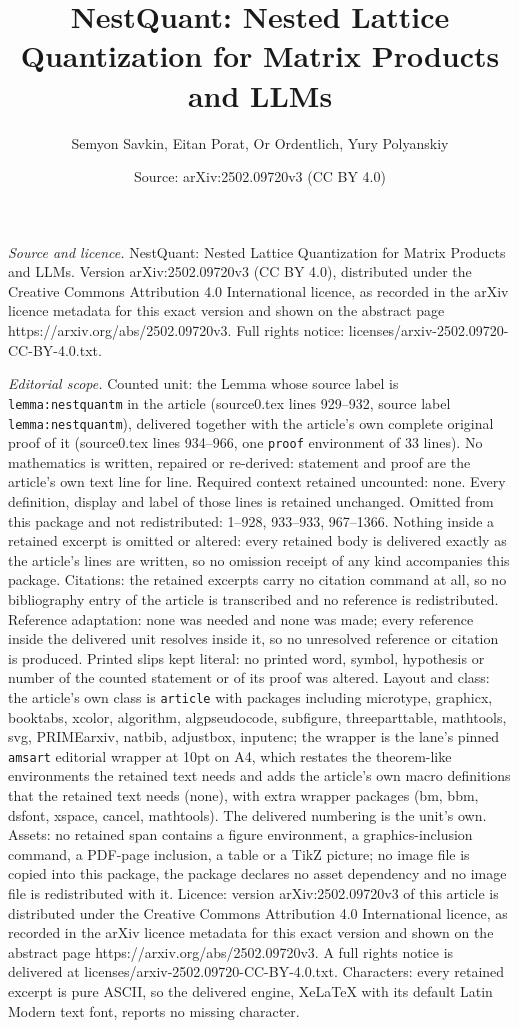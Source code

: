 \documentclass[10pt,a4paper]{amsart}
\title[NestQuant: Nested Lattice Quantization for Matrix Products a]{NestQuant: Nested Lattice Quantization for Matrix Products and LLMs}
\author{Semyon Savkin, Eitan Porat, Or Ordentlich, Yury Polyanskiy}
\date{Source: arXiv:2502.09720v3 (CC BY 4.0)}
\begin{document}
\maketitle

\noindent\emph{Source and licence.} NestQuant: Nested Lattice Quantization for Matrix Products and LLMs. Version arXiv:2502.09720v3 (CC BY 4.0), distributed under the Creative Commons Attribution 4.0 International licence, as recorded in the arXiv licence metadata for this exact version and shown on the abstract page https://arxiv.org/abs/2502.09720v3. Full rights notice: licenses/arxiv-2502.09720-CC-BY-4.0.txt.\par\smallskip

\noindent\textit{Editorial scope.} Counted unit: the Lemma whose source label is \texttt{lemma:nestquantm} in the article (source0.tex lines 929--932, source label \texttt{lemma:nestquantm}), delivered together with the article's own complete original proof of it (source0.tex lines 934--966, one \texttt{proof} environment of 33 lines). No mathematics is written, repaired or re-derived: statement and proof are the article's own text line for line. Required context retained uncounted: none. Every definition, display and label of those lines is retained unchanged. Omitted from this package and not redistributed: 1--928, 933--933, 967--1366. Nothing inside a retained excerpt is omitted or altered: every retained body is delivered exactly as the article's lines are written, so no omission receipt of any kind accompanies this package. Citations: the retained excerpts carry no citation command at all, so no bibliography entry of the article is transcribed and no reference is redistributed. Reference adaptation: none was needed and none was made; every reference inside the delivered unit resolves inside it, so no unresolved reference or citation is produced. Printed slips kept literal: no printed word, symbol, hypothesis or number of the counted statement or of its proof was altered. Layout and class: the article's own class is \texttt{article} with packages including microtype, graphicx, booktabs, xcolor, algorithm, algpseudocode, subfigure, threeparttable, mathtools, svg, PRIMEarxiv, natbib, adjustbox, inputenc; the wrapper is the lane's pinned \texttt{amsart} editorial wrapper at 10pt on A4, which restates the theorem-like environments the retained text needs and adds the article's own macro definitions that the retained text needs (none), with extra wrapper packages (bm, bbm, dsfont, xspace, cancel, mathtools). The delivered numbering is the unit's own. Assets: no retained span contains a figure environment, a graphics-inclusion command, a PDF-page inclusion, a table or a TikZ picture; no image file is copied into this package, the package declares no asset dependency and no image file is redistributed with it. Licence: version arXiv:2502.09720v3 of this article is distributed under the Creative Commons Attribution 4.0 International licence, as recorded in the arXiv licence metadata for this exact version and shown on the abstract page https://arxiv.org/abs/2502.09720v3. A full rights notice is delivered at licenses/arxiv-2502.09720-CC-BY-4.0.txt. Characters: every retained excerpt is pure ASCII, so the delivered engine, XeLaTeX with its default Latin Modern text font, reports no missing character.
\end{document}

